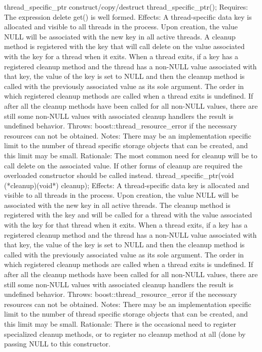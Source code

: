 \documentclass[fontsize=10pt,paper=A4,pagesize,DIV=15]{scrartcl}
\begin{document}
thread_specific_ptr construct/copy/destruct
thread_specific_ptr();
Requires:	The expression delete get() is well formed.
Effects:	A thread-specific data key is allocated and visible to all threads in the process. Upon creation, the value NULL will be associated with the new key in all active threads. A cleanup method is registered with the key that will call delete on the value associated with the key for a thread when it exits. When a thread exits, if a key has a registered cleanup method and the thread has a non-NULL value associated with that key, the value of the key is set to NULL and then the cleanup method is called with the previously associated value as its sole argument. The order in which registered cleanup methods are called when a thread exits is undefined. If after all the cleanup methods have been called for all non-NULL values, there are still some non-NULL values with associated cleanup handlers the result is undefined behavior.
Throws:	boost::thread_resource_error if the necessary resources can not be obtained.
Notes:	There may be an implementation specific limit to the number of thread specific storage objects that can be created, and this limit may be small.
Rationale:	The most common need for cleanup will be to call delete on the associated value. If other forms of cleanup are required the overloaded constructor should be called instead.
thread_specific_ptr(void (*cleanup)(void*) cleanup);
Effects:	A thread-specific data key is allocated and visible to all threads in the process. Upon creation, the value NULL will be associated with the new key in all active threads. The cleanup method is registered with the key and will be called for a thread with the value associated with the key for that thread when it exits. When a thread exits, if a key has a registered cleanup method and the thread has a non-NULL value associated with that key, the value of the key is set to NULL and then the cleanup method is called with the previously associated value as its sole argument. The order in which registered cleanup methods are called when a thread exits is undefined. If after all the cleanup methods have been called for all non-NULL values, there are still some non-NULL values with associated cleanup handlers the result is undefined behavior.
Throws:	boost::thread_resource_error if the necessary resources can not be obtained.
Notes:	There may be an implementation specific limit to the number of thread specific storage objects that can be created, and this limit may be small.
Rationale:	There is the occasional need to register specialized cleanup methods, or to register no cleanup method at all (done by passing NULL to this constructor.
\end{document}
